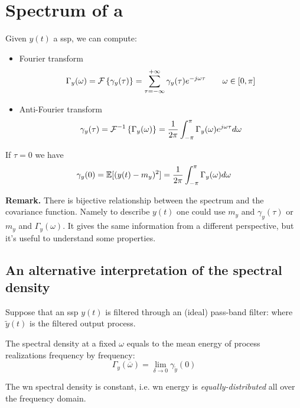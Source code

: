 \section{Spectrum of a }
Given $y(t)$ a \gls{ssp}, we can compute:
\begin{itemize}
	\item Fourier transform
	\[
		\Gamma _{y}(\omega)=\mathcal{F}\left\{\gamma _{y}(\tau )\right\}=\sum_{\tau =-\infty }^{+\infty} \gamma _{y}(\tau ) e^{-j\omega \tau } \qquad \omega \in [0,\pi ]
	\]
	\item Anti-Fourier transform
	\[
		\gamma _{y}(\tau)=\mathcal{F}^{-1}\left\{\Gamma _{y}(\omega)\right\}=\frac{1}{2\pi }\int_{-\pi }^{\pi } \Gamma _{y}(\omega )e^{j\omega \tau }d\omega  
	\]
\end{itemize}

\begin{obs}
If $\tau =0$ we have
\[
	\gamma _{y}(0)=\mathbb{E}[(y(t)-m_{y})^2 ]=\frac{1}{2\pi }\int_{-\pi }^{\pi } \Gamma _{y}(\omega )d\omega 
\]
\end{obs}
\textbf{Remark.}
There is bijective relationship between the spectrum and the covariance function. Namely to describe $y(t)$ one could use $m_{y}$ and $\gamma _{y}(\tau )$ or $m_{y}$ and $\Gamma _{y}(\omega)$. It gives the same information from a different perspective, but it's useful to understand some properties.

\subsection{An alternative interpretation of the spectral density}
Suppose that an \gls{ssp} $y(t)$ is filtered through an (ideal) pass-band filter:
where $\tilde{y}(t)$ is the filtered output process.
\begin{theorem}
	The spectral density at a fixed $\omega$ equals to the mean energy of process realizations frequency by frequency:
	\[
		\Gamma _{y}(\overline{\omega})=\lim_{\delta  \to 0} \gamma _{\tilde{y}}(0)
	\]
\end{theorem}

\begin{example}
The \gls{wn} spectral density is constant, i.e. \gls{wn} energy is \emph{equally-distributed} all over the frequency domain.
\end{example}

